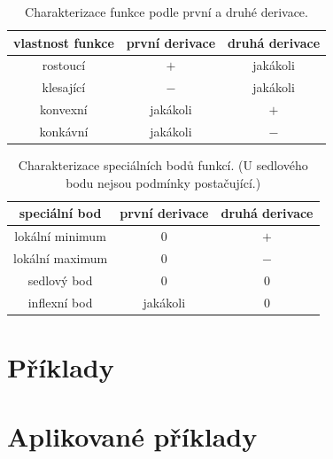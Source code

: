 \begin{table}[H]
    \centering

    \begin{tabular}{|c|c|c|}
        \hline
        vlastnost funkce & první derivace & druhá derivace \\
        \hline
        rostoucí & $+$ & jakákoli \\
        klesající & $-$ & jakákoli  \\
        konvexní & jakákoli & $+$ \\
        konkávní & jakákoli & $-$ \\ \hline
    \end{tabular}
    \caption{Charakterizace funkce podle první a druhé derivace.}
\end{table}

\begin{table}[H]
    \centering

    \begin{tabular}{|c|c|c|}
        \hline
        speciální bod & první derivace & druhá derivace \\
        \hline
        lokální minimum & $0$ & $+$ \\
        lokální maximum & $0$ & $-$ \\
        sedlový bod & $0$ & $0$ \\
        inflexní bod & jakákoli & $0$ \\ \hline
    \end{tabular}
    \caption{Charakterizace speciálních bodů funkcí. (U sedlového bodu nejsou podmínky postačující.)}
\end{table}

\section{Příklady}

\begin{example}
   

\end{example}

\section{Aplikované příklady}

